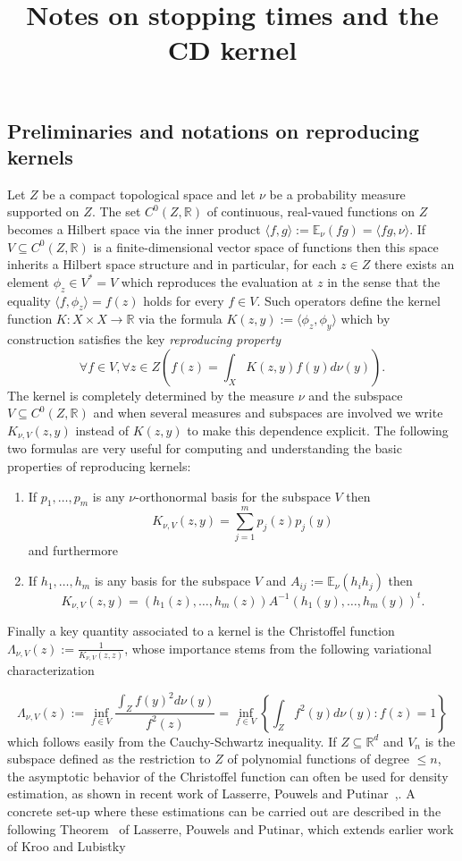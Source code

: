 \documentclass[12pt]{amsart}
\title{Notes on stopping times and the CD kernel}
\theoremstyle{definition}
\renewcommand{\leq}{\leqslant}
\newcommand{\RR}{\ensuremath{\mathbb{R}}}
\newcommand{\EE}{\ensuremath{\mathbb{E}}}
\begin{document}



\subsection{Preliminaries and notations on reproducing kernels}

Let $Z$ be a compact topological space and let $\nu$ be a probability measure supported on $Z$. The set $C^0(Z,\RR)$ of continuous, real-vaued functions on $Z$ becomes a Hilbert space via the inner product $\langle f,g\rangle:=\EE_{\nu}\left(fg\right)=\langle fg,\nu\rangle$. If $V\subseteq C^0(Z,\RR)$ is a finite-dimensional vector space of functions then this space inherits a Hilbert space structure and in particular, for each $z\in Z$ there exists an element $\phi_z\in V^*=V$ which reproduces the evaluation at $z$ in the sense that the equality $\langle f,\phi_z\rangle = f(z)$ holds for every $f\in V$. Such operators define the kernel function $K: X\times X\rightarrow \RR$ via the formula $K(z,y):=\langle \phi_z,\phi_y\rangle$ which by construction satisfies the key {\it reproducing property}
\[\forall f\in V,\forall z\in Z\left(f(z)=\int_X K(z,y)f(y)d\nu(y)\right).\]
The kernel is completely determined by the measure $\nu$ and the subspace $V\subseteq C^0(Z,\RR)$ and when several measures and subspaces are involved we write $K_{\nu,V}(z,y)$ instead of $K(z,y)$ to make this dependence explicit.
The following two formulas are very useful for computing and understanding the basic properties of reproducing kernels:
\begin{enumerate}
\item If $p_1,\dots, p_m$ is any $\nu$-orthonormal basis for the subspace $V$ then
\[K_{\nu,V}(z,y)=\sum_{j=1}^m p_j(z)p_j(y)\] and furthermore
\item If $h_1,\dots, h_m$ is any basis for the subspace $V$ and $A_{ij}:=\EE_{\nu}\left(h_ih_j\right)$
then
\[K_{\nu,V}(z,y)=(h_1(z),\dots, h_m(z))A^{-1} (h_1(y),\dots, h_m(y))^t.\]
\end{enumerate}

Finally a key quantity associated to a kernel is the Christoffel function $\Lambda_{\nu,V}(z):=\frac{1}{K_{\nu,V}(z,z)}$, whose importance stems from the following variational characterization

\[\Lambda_{\nu,V}(z):=\inf_{f\in V}\frac{\int_Z f(y)^2d\nu(y)}{f^2(z)} =\inf_{f\in V}\left\{\int_Z f^2(y)d\nu(y):  f(z)=1 \right\}\]
which follows easily from the Cauchy-Schwartz inequality. 
If $Z\subseteq \RR^d$ and $V_n$ is the subspace defined as the restriction to $Z$ of polynomial functions of degree $\leq n$, the asymptotic behavior of the Christoffel function can often be used for density estimation, as shown in recent work of Lasserre, Pouwels and Putinar~\cite{LPP_article},\cite{LPPBook}. A concrete set-up where these estimations can be carried out are described in the following Theorem~\cite[Theorem 5.3.4]{LPPBook} of Lasserre, Pouwels and Putinar, which extends earlier work of Kroo and Lubistky~\cite{KrooLubitsky2013a}
\end{document}
